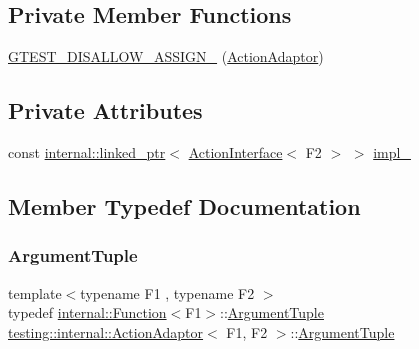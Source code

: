 \subsection*{Private Member Functions}
\begin{DoxyCompactItemize}
\item 
\mbox{\hyperlink{classtesting_1_1internal_1_1_action_adaptor_ad46465f82ccd055324fa267308c2753e}{G\+T\+E\+S\+T\+\_\+\+D\+I\+S\+A\+L\+L\+O\+W\+\_\+\+A\+S\+S\+I\+G\+N\+\_\+}} (\mbox{\hyperlink{classtesting_1_1internal_1_1_action_adaptor}{Action\+Adaptor}})
\end{DoxyCompactItemize}
\subsection*{Private Attributes}
\begin{DoxyCompactItemize}
\item 
const \mbox{\hyperlink{classtesting_1_1internal_1_1linked__ptr}{internal\+::linked\+\_\+ptr}}$<$ \mbox{\hyperlink{classtesting_1_1_action_interface}{Action\+Interface}}$<$ F2 $>$ $>$ \mbox{\hyperlink{classtesting_1_1internal_1_1_action_adaptor_a555b8bc3e770b9a0d824be1ee2403783}{impl\+\_\+}}
\end{DoxyCompactItemize}


\subsection{Member Typedef Documentation}
\mbox{\label{classtesting_1_1internal_1_1_action_adaptor_a4f78fb73f97b72fea8a93b78a8ab5704}} 
\subsubsection{\texorpdfstring{ArgumentTuple}{ArgumentTuple}}
{\footnotesize\ttfamily template$<$typename F1 , typename F2 $>$ \\
typedef \mbox{\hyperlink{structtesting_1_1internal_1_1_function}{internal\+::\+Function}}$<$F1$>$\+::\mbox{\hyperlink{classtesting_1_1internal_1_1_action_adaptor_a4f78fb73f97b72fea8a93b78a8ab5704}{Argument\+Tuple}} \mbox{\hyperlink{classtesting_1_1internal_1_1_action_adaptor}{testing\+::internal\+::\+Action\+Adaptor}}$<$ F1, F2 $>$\+::\mbox{\hyperlink{classtesting_1_1internal_1_1_action_adaptor_a4f78fb73f97b72fea8a93b78a8ab5704}{Argument\+Tuple}}}

